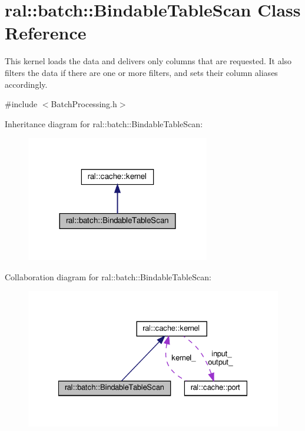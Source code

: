 \hypertarget{classral_1_1batch_1_1BindableTableScan}{}\section{ral\+:\+:batch\+:\+:Bindable\+Table\+Scan Class Reference}
\label{classral_1_1batch_1_1BindableTableScan}


This kernel loads the data and delivers only columns that are requested. It also filters the data if there are one or more filters, and sets their column aliases accordingly.  




{\ttfamily \#include $<$Batch\+Processing.\+h$>$}



Inheritance diagram for ral\+:\+:batch\+:\+:Bindable\+Table\+Scan\+:\nopagebreak
\begin{figure}[H]
\begin{center}
\leavevmode
\includegraphics[width=227pt]{classral_1_1batch_1_1BindableTableScan__inherit__graph}
\end{center}
\end{figure}


Collaboration diagram for ral\+:\+:batch\+:\+:Bindable\+Table\+Scan\+:\nopagebreak
\begin{figure}[H]
\begin{center}
\leavevmode
\includegraphics[width=328pt]{classral_1_1batch_1_1BindableTableScan__coll__graph}
\end{center}
\end{figure}
